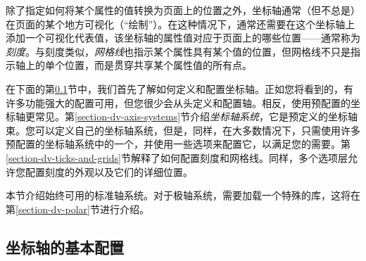除了指定如何将某个属性的值转换为页面上的位置之外，坐标轴通常（但不总是）在页面的某个地方可视化（``绘制''）。在这种情况下，通常还需要在这个坐标轴上添加一个可视化代表值，该坐标轴的属性值对应于页面上的哪些位置——通常称为\emph{刻度}。与刻度类似，\emph{网格线}也指示某个属性具有某个值的位置，但网格线不只是指示轴上的单个位置，而是贯穿共享某个属性值的所有点。


在下面的第\ref{section-dv-axes-main}节中，我们首先了解如何定义和配置坐标轴。正如您将看到的，有许多功能强大的配置可用，但您很少会从头定义和配置轴。相反，使用预配置的坐标轴更常见。第\ref{section-dv-axis-systems}节介绍\emph{坐标轴系统}，它是预定义的坐标轴束。您可以定义自己的坐标轴系统，但是，同样，在大多数情况下，只需使用许多预配置的坐标轴系统中的一个，并使用一些选项来配置它，以满足您的需要。第\ref{section-dv-ticks-and-grids}节解释了如何配置刻度和网格线。同样，多个选项层允许您配置刻度的外观以及它们的详细位置。


本节介绍始终可用的标准轴系统。对于极轴系统，需要加载一个特殊的库，这将在第\ref{section-dv-polar}节进行介绍。


\subsection{坐标轴的基本配置}
\label{section-dv-axes-main}

